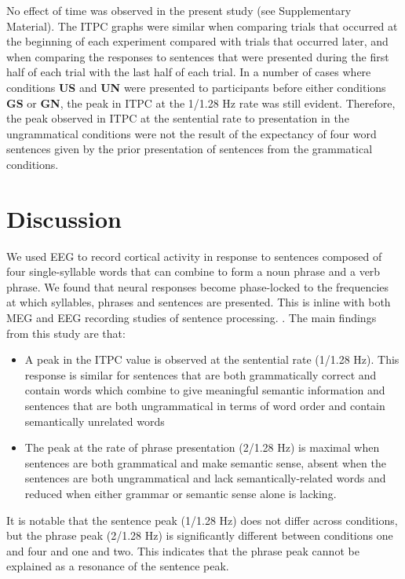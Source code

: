\documentclass[10pt,letterpaper]{article}
\begin{document}
No effect of time was observed in the present study (see Supplementary Material). The ITPC graphs were similar when comparing trials that occurred at the beginning of each experiment compared with trials that occurred later, and when comparing the responses to sentences that were presented during the first half of each trial with the last half of each trial. In a number of cases where conditions \textbf{US} and \textbf{UN} were presented to participants before either conditions \textbf{GS} or \textbf{GN}, the peak in ITPC at the 1/1.28 Hz rate was still evident. Therefore, the peak observed in ITPC at the sentential rate to presentation in the ungrammatical conditions were not the result of the expectancy of four word sentences given by the prior presentation of sentences from the grammatical conditions. 







\section*{Discussion}


We used EEG to record cortical activity in response to sentences
composed of four single-syllable words that can combine to form a noun
phrase and a verb phrase. We found that neural responses become
phase-locked to the frequencies at which syllables, phrases and
sentences are presented. This is inline with both MEG and EEG
recording studies of sentence processing.
\cite{DingEtAl2015,DingEtAl2017}. The main findings from this study
are that:
\begin{itemize}
\item A peak in the ITPC value is observed at the sentential rate
  (1/1.28 Hz). This response is similar for sentences that are both
  grammatically correct and contain words which combine to give
  meaningful semantic information and sentences that are both
  ungrammatical in terms of word order and contain semantically
  unrelated words
\item The peak at the rate of phrase presentation
  (2/1.28 Hz) is maximal when sentences are both grammatical and make
  semantic sense, absent when the sentences are both ungrammatical and
  lack semantically-related words and reduced when either grammar or
  semantic sense alone is lacking. 
\end{itemize}
%
% 
%
It is notable that the sentence peak (1/1.28 Hz) does not differ
across conditions, but the phrase peak (2/1.28 Hz) is significantly
different between conditions one and four and one and two. This indicates that the
phrase peak cannot be explained as a resonance of the sentence peak.
\end{document}
